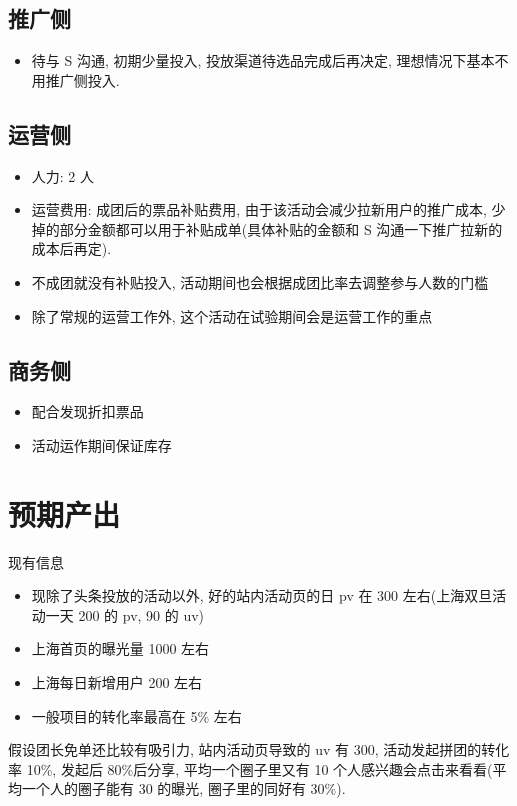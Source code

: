 \documentclass[11pt,a4paper]{article}
\begin{document}
\subsection{推广侧}
\label{sec:orge738206}
\begin{itemize}
\item 待与 S 沟通, 初期少量投入, 投放渠道待选品完成后再决定, 理想情况下基本不用推广侧投入.
\end{itemize}
\subsection{运营侧}
\label{sec:orgd525a37}
\begin{itemize}
\item 人力: 2 人
\item 运营费用: 成团后的票品补贴费用, 由于该活动会减少拉新用户的推广成本, 少掉的部分金额都可以用于补贴成单(具体补贴的金额和 S 沟通一下推广拉新的成本后再定).
\item 不成团就没有补贴投入, 活动期间也会根据成团比率去调整参与人数的门槛
\item 除了常规的运营工作外, 这个活动在试验期间会是运营工作的重点
\end{itemize}
\subsection{商务侧}
\label{sec:org0ba08b8}
\begin{itemize}
\item 配合发现折扣票品
\item 活动运作期间保证库存
\end{itemize}

\section{预期产出}
\label{sec:org899d697}
现有信息
\begin{itemize}
\item 现除了头条投放的活动以外, 好的站内活动页的日 pv 在 300 左右(上海双旦活动一天 200 的 pv, 90 的 uv)
\item 上海首页的曝光量 1000 左右
\item 上海每日新增用户 200 左右
\item 一般项目的转化率最高在 5\% 左右
\end{itemize}
假设团长免单还比较有吸引力, 站内活动页导致的 uv 有 300, 活动发起拼团的转化率 10\%, 发起后 80\%后分享, 平均一个圈子里又有 10 个人感兴趣会点击来看看(平均一个人的圈子能有 30 的曝光, 圈子里的同好有 30\%).
\end{document}
